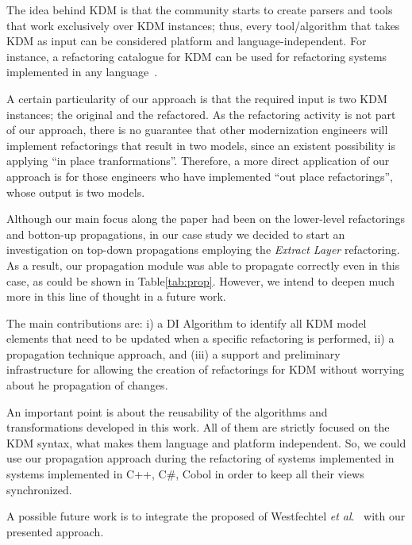 
The idea behind KDM is that the community starts to create parsers and tools that work exclusively over KDM instances; thus, every tool/algorithm that takes KDM as input can be considered platform and language-independent. For instance, a refactoring catalogue for KDM can be used for refactoring systems implemented in any language~\cite{IRIDurelliCatalogo}.

  A certain particularity of our approach is that the required input is two KDM instances; the original and the refactored. As the refactoring activity is not part of our approach, there is no guarantee that other modernization engineers will implement refactorings that result in two models, since an existent possibility is applying ``in place tranformations''. Therefore, a more direct application of our approach is for those engineers who have implemented ``out place refactorings'', whose output is two models.
 
Although our main focus along the paper had been on the lower-level refactorings and botton-up propagations, in our case study we decided to start an investigation on top-down propagations employing the \textit{Extract Layer} refactoring. As a result, our propagation module was able to propagate correctly even in this case, as could be shown in Table\ref{tab:prop}. However, we intend to deepen much more in this line of thought in a future work.

The main contributions are: i) a DI Algorithm to identify all KDM model elements that need to be updated when a specific refactoring is performed, ii) a propagation technique approach, and (iii) a support and preliminary infrastructure for allowing the creation of refactorings for KDM without worrying about he propagation of changes.

An important point is about the reusability of the algorithms and transformations developed in this work. All of them are strictly focused on the KDM syntax, what makes them language and platform independent. So, we could use our propagation approach during the refactoring of systems implemented in systems implemented in C++, C\#, Cobol in order to keep all their views synchronized.

 A possible future work is to integrate the proposed of Westfechtel \textit{et al}.~\cite{ICSOFT2014_Winetzhammer} with our presented approach.